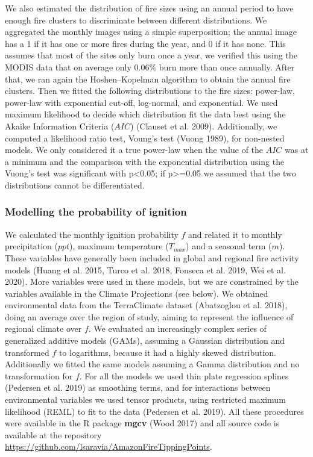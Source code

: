 \documentclass[
]{article}
\begin{document}
We also estimated the distribution of fire sizes using an annual period
to have enough fire clusters to discriminate between different
distributions. We aggregated the monthly images using a simple
superposition; the annual image has a 1 if it has one or more fires
during the year, and 0 if it has none. This assumes that most of the
sites only burn once a year, we verified this using the MODIS data that
on average only 0.06\% burn more than once annually. After that, we ran
again the Hoshen--Kopelman algorithm to obtain the annual fire clusters.
Then we fitted the following distributions to the fire sizes: power-law,
power-law with exponential cut-off, log-normal, and exponential. We used
maximum likelihood to decide which distribution fit the data best using
the Akaike Information Criteria (\(AIC\)) (Clauset et al. 2009).
Additionally, we computed a likelihood ratio test, Voung's test (Vuong
1989), for non-nested models. We only considered it a true power-law
when the value of the \(AIC\) was at a minimum and the comparison with
the exponential distribution using the Vuong's test was significant with
p\textless0.05; if p\textgreater=0.05 we assumed that the two
distributions cannot be differentiated.

\subsubsection{Modelling the probability of
ignition}\label{modelling-the-probability-of-ignition}

We calculated the monthly ignition probability \(f\) and related it to
monthly precipitation (\(ppt\)), maximum temperature (\(T_{max}\)) and a
seasonal term (\(m\)). These variables have generally been included in
global and regional fire activity models (Huang et al. 2015, Turco et
al. 2018, Fonseca et al. 2019, Wei et al. 2020). More variables were
used in these models, but we are constrained by the variables available
in the Climate Projections (see below). We obtained environmental data
from the TerraClimate dataset (Abatzoglou et al. 2018), doing an average
over the region of study, aiming to represent the influence of regional
climate over \(f\). We evaluated an increasingly complex series of
generalized additive models (GAMs), assuming a Gaussian distribution and
transformed \(f\) to logarithms, because it had a highly skewed
distribution. Additionally we fitted the same models assuming a Gamma
distribution and no transformation for \(f\). For all the models we used
thin plate regression splines (Pedersen et al. 2019) as smoothing terms,
and for interactions between environmental variables we used tensor
products, using restricted maximum likelihood (REML) to ﬁt to the data
(Pedersen et al. 2019). All these procedures were available in the R
package \textbf{mgcv} (Wood 2017) and all source code is available at
the repository
\url{https://github.com/lsaravia/AmazonFireTippingPoints}.
\end{document}
